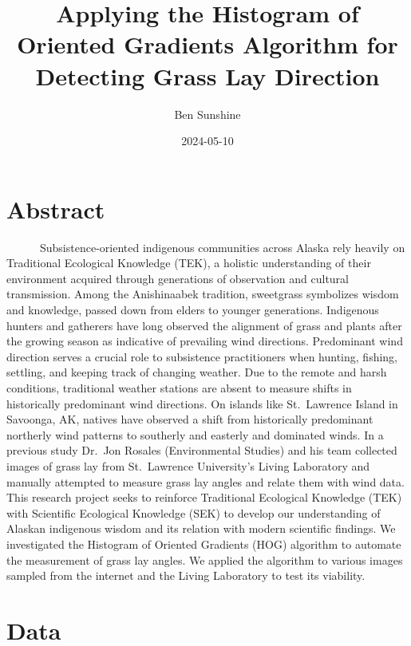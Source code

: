 \documentclass[
  letterpaper,
  DIV=11,
  numbers=noendperiod]{scrreprt}
\title{Applying the Histogram of Oriented Gradients Algorithm for
Detecting Grass Lay Direction}
\author{Ben Sunshine}
\date{2024-05-10}
\renewcommand*\contentsname{Table of contents}
\newcommand\contentsname{Table of contents}
\begin{document}
\maketitle

\renewcommand*\contentsname{Table of contents}
{
\hypersetup{linkcolor=}
\setcounter{tocdepth}{2}
\tableofcontents
}

\chapter{Abstract}\label{abstract}

~~~~~~Subsistence-oriented indigenous communities across Alaska rely
heavily on Traditional Ecological Knowledge (TEK), a holistic
understanding of their environment acquired through generations of
observation and cultural transmission. Among the Anishinaabek tradition,
sweetgrass symbolizes wisdom and knowledge, passed down from elders to
younger generations. Indigenous hunters and gatherers have long observed
the alignment of grass and plants after the growing season as indicative
of prevailing wind directions. Predominant wind direction serves a
crucial role to subsistence practitioners when hunting, fishing,
settling, and keeping track of changing weather. Due to the remote and
harsh conditions, traditional weather stations are absent to measure
shifts in historically predominant wind directions. On islands like
St.~Lawrence Island in Savoonga, AK, natives have observed a shift from
historically predominant northerly wind patterns to southerly and
easterly and dominated winds. In a previous study Dr.~Jon Rosales
(Environmental Studies) and his team collected images of grass lay from
St.~Lawrence University's Living Laboratory and manually attempted to
measure grass lay angles and relate them with wind data. This research
project seeks to reinforce Traditional Ecological Knowledge (TEK) with
Scientific Ecological Knowledge (SEK) to develop our understanding of
Alaskan indigenous wisdom and its relation with modern scientific
findings. We investigated the Histogram of Oriented Gradients (HOG)
algorithm to automate the measurement of grass lay angles. We applied
the algorithm to various images sampled from the internet and the Living
Laboratory to test its viability.


\chapter{Data}\label{data}
\end{document}
